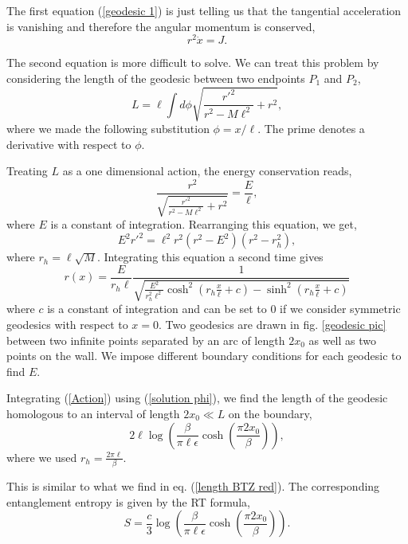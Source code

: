The first equation (\ref{geodesic 1}) is just telling us that the tangential acceleration is vanishing and therefore the angular momentum is conserved,
\begin{equation}
    r^2\dot x=J.
\end{equation}

The second equation is more difficult to solve. We can treat this problem by considering the length of the geodesic between two endpoints $P_1$ and $P_2$,
\begin{equation}\label{Action}
    L = \ell\int d \phi\sqrt{\frac{r'^2}{r^2-M\ell^2}+r^2},
\end{equation}
where we made the following substitution $\phi=x/\ell$. The prime denotes a derivative with respect to $\phi$.

Treating $L$ as a one dimensional action, the energy conservation reads,
\begin{equation}
    \frac{r^2}{\sqrt{\frac{r'^2}{r^2-M\ell^2}+r^2}}= \frac{E}{\ell},
\end{equation}
where $E$ is a constant of integration. Rearranging this equation, we get,
\begin{equation}
    E^2r'^2 = \ell^2r^2(r^2-E^2)(r^2-r_h^2),
\end{equation}
where $r_h=\ell\sqrt{M}$. Integrating this equation a second time gives
\begin{equation}\label{solution phi}
    r(x) = \frac{E}{r_h\ell}\frac{1}{\sqrt{\frac{E^2}{r_h^2\ell^2}\cosh^2\left(r_h\frac{x}{\ell}+c\right)-\sinh^2\left(r_h\frac{x}{\ell}+c\right)}}
\end{equation}
where $c$ is a constant of integration and can be set to 0 if we consider symmetric geodesics with respect to $x = 0$. Two geodesics are drawn in  fig. \ref{geodesic pic} between two infinite points separated by an arc of length $2x_0$ as well as two points on the wall. We impose different boundary conditions for each geodesic to find $E$.

Integrating (\ref{Action}) using (\ref{solution phi}), we find the length of the geodesic homologous to an interval of length $2x_0\ll L$ on the boundary,
\begin{equation}\label{S1}
    2\ell\log\left(\frac{\beta}{\pi\ell\epsilon}\cosh\left(\frac{\pi 2x_0 }{\beta}\right)\right),
\end{equation}
where we used $r_h=\frac{2\pi\ell}{\beta}$.

This is similar to what we find in eq. (\ref{length BTZ red}). The corresponding entanglement entropy is given by the RT formula,
\begin{equation}
    S = \frac{c}{3}\log\left(\frac{\beta}{\pi\ell\epsilon}\cosh\left(\frac{\pi 2x_0 }{\beta}\right)\right).
\end{equation}

